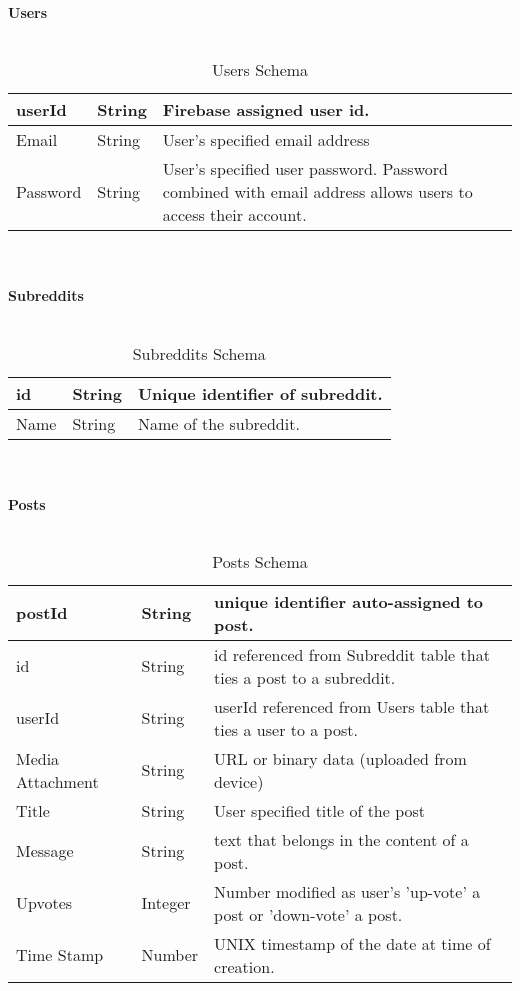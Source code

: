 \documentclass[12pt,fleqn]{article}
\begin{document}
\textbf{Users}\\ \\
\begin{table}[H]
\begin{tabular} { |p{3cm}| p{2cm}| p{10cm}| }
\hline
userId & String & Firebase assigned user id. \\
\hline
Email & String & User's specified email address \\
\hline
Password & String & User's specified user password. Password combined with email address allows users to access their account. \\
\hline
\end{tabular}
\caption{Users Schema} \label{tab:users}
\end{table}
\\ \\
\textbf{Subreddits} \\ \\ 
\begin{table}[H]
\begin{tabular}{ |p{3cm}| p{2cm}| p{10cm}| }
\hline
 id & String & Unique identifier of subreddit.\\
\hline
Name & String & Name of the subreddit. \\
\hline
\end{tabular}
\caption{Subreddits Schema} \label{tab:subreddits}
\end{table}
\\ \\ 
\textbf{Posts} \\ \\
\begin{table}[H]
\begin{tabular}{ |p{3cm}| p{2cm}| p{10cm}| }
\hline
postId & String & unique identifier auto-assigned to post.\\
\hline
id & String & id referenced from Subreddit table that ties a post to a subreddit. \\
\hline
userId & String & userId referenced from Users table that ties a user to a post.\\
\hline
Media Attachment & String & URL or binary data (uploaded from device) \\
\hline
Title & String & User specified title of the post \\
\hline
Message & String & text that belongs in the content of a post. \\
\hline
Upvotes & Integer & Number modified as user's 'up-vote' a post or 'down-vote' a post. \\
\hline
Time Stamp & Number & UNIX timestamp of the  date at time of creation. \\
\hline
\end{tabular}
\caption{Posts Schema} \label{tab:posts}
\end{table}
\end{document}
